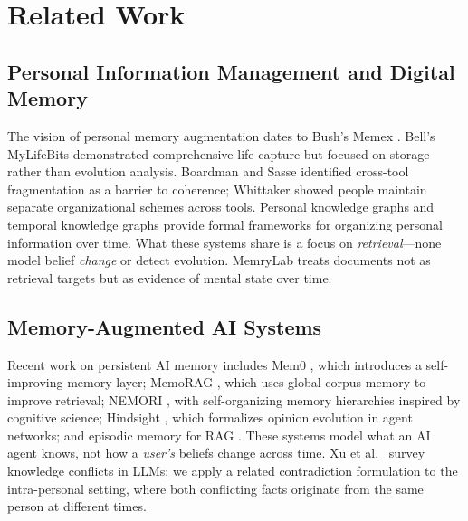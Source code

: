 \documentclass[pdflatex,sn-mathphys-num]{sn-jnl}
\begin{document}
\section{Related Work}\label{sec:related}

\subsection{Personal Information Management and Digital Memory}

The vision of personal memory augmentation dates to Bush's Memex \cite{bush1945memex}. Bell's MyLifeBits \cite{gemmell2002mylifebits,bell2009total} demonstrated comprehensive life capture but focused on storage rather than evolution analysis. Boardman and Sasse \cite{boardman2004stuff} identified cross-tool fragmentation as a barrier to coherence; Whittaker \cite{whittaker2011personal} showed people maintain separate organizational schemes across tools. Personal knowledge graphs \cite{balog2019personal,kejriwal2021knowledge} and temporal knowledge graphs \cite{jiang2024tkg_survey,leblay2018temporal} provide formal frameworks for organizing personal information over time. What these systems share is a focus on \emph{retrieval}---none model belief \emph{change} or detect evolution. MemryLab treats documents not as retrieval targets but as evidence of mental state over time.

\subsection{Memory-Augmented AI Systems}

Recent work on persistent AI memory includes Mem0 \cite{chhikara2025mem0}, which introduces a self-improving memory layer; MemoRAG \cite{qian2025memorag}, which uses global corpus memory to improve retrieval; NEMORI \cite{nan2025nemori}, with self-organizing memory hierarchies inspired by cognitive science; Hindsight \cite{latimer2025hindsight}, which formalizes opinion evolution in agent networks; and episodic memory for RAG \cite{nair2025episodic}. These systems model what an AI agent knows, not how a \emph{user's} beliefs change across time. Xu et al.\ \cite{xu2024knowledge} survey knowledge conflicts in LLMs; we apply a related contradiction formulation to the intra-personal setting, where both conflicting facts originate from the same person at different times.
\end{document}

